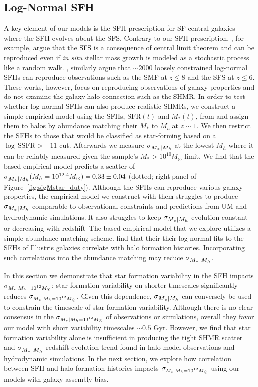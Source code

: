 \documentclass[12pt, letterpaper, preprint, tighten]{aastex62}
\newcommand{\siglogm}{\sigma_{\scaleto{M_*|M_h}{8pt}}}
\newcommand{\sigtwe}{\sigma_{\scaleto{M_*|M_h=10^{12}M_\odot}{8pt}}}
\begin{document}
\subsection{Log-Normal SFH}
A key element of our models is the SFH prescription for SF central galaxies where
the SFH evolves about the SFS. Contrary to our SFH prescription, \cite{kelson2014},
for example, argue that the SFS is a consequence of central limit theorem
and can be reproduced even if \emph{in situ} stellar mass growth is modeled as
a stochastic process like a random walk. \cite{gladders2013,abramson2015,abramson2016},
similarly argue that $\sim2000$ loosely constrained log-normal SFHs can reproduce
observations such as the SMF at $z \leq 8$ and the SFS at $z \leq 6$. These works,
however, focus on reproducing observations of galaxy properties and do not examine
the galaxy-halo connection such as the SHMR. In order to test whether log-normal
SFHs can also produce realistic SHMRs,
we construct a simple empirical model using  the SFHs, $\mathrm{SFR}(t)$ and
$M_*(t)$, from \cite{abramson2016} and assign them to halos by abundance matching
their $M_*$ to $M_h$ at $z{\sim}1$.
We then restrict the SFHs to those that would be classified as star-forming based
on a $\log\,\mathrm{SSFR} > -11$ cut. Afterwards we measure $\siglogm$
at the lowest $M_h$ where it can be reliably measured given the \cite{abramson2016}
sample's $M_*{>}10^{10}M_\odot$ limit.
We find that the \cite{abramson2016} based empirical model predicts a scatter
of $\siglogm(M_h=10^{12.4}M_\odot) = 0.33\pm0.04$ (dotted; right panel of Figure~\ref{fig:sigMstar_duty}).
Although the \cite{abramson2016} SFHs can reproduce various galaxy properties,
the empirical model we construct with them struggles to produce $\siglogm$ comparable 
to observational constraints and predictions from UM and hydrodynamic simulations.
It also struggles to keep $\siglogm$ evolution constant or decreasing with redshift. 
The \cite{abramson2016} based empirical model that we explore utilizes a simple
abundance matching scheme. \cite{diemer2017} find that their their log-normal fits
to the SFHs of Illustris galaxies correlate with halo formation histories. Incorporating
such correlations into the abundance matching may reduce $\siglogm$.

In this section we demonstrate that star formation variability in the SFH impacts
$\sigtwe$: star formation variability on shorter timescales significantly 
reduces $\sigtwe$. Given this dependence, $\siglogm$ can conversely be used to constrain
the timescale of star formation variability. Although there is no clear consensus in 
the $\sigtwe$ of observations or simulations, overall they favor our model with short 
variability timescales $\sim0.5$ Gyr. However, we find that star formation variability 
alone is insufficient in producing the tight SHMR scatter and $\siglogm$ redshift evolution 
trend found in halo model observations and hydrodynamic simulations. In the next section, 
we explore how correlation between SFH and halo formation histories impacts $\sigtwe$
using our models with galaxy assembly bias.
\end{document}
